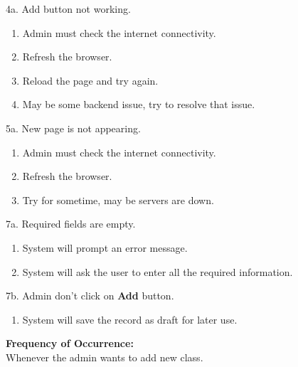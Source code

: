 \documentclass[12pt]{article}
\begin{document}
4a. Add button not working.
\begin{enumerate}
\item Admin must check the internet connectivity.
\item Refresh the browser.
\item Reload the page and try again.
\item May be some backend issue, try to resolve that issue.
\end{enumerate}
5a. New page is not appearing.
\begin{enumerate}
\item Admin must check the internet connectivity.
\item Refresh the browser.
\item Try for sometime, may be servers are down.
\end{enumerate}
7a. Required fields are empty.
\begin{enumerate}
\item System will prompt an error message.
\item System will ask the user to enter all the required information.
\end{enumerate}
7b. Admin don't click on \textbf{Add} button.
\begin{enumerate}
\item System will save the record as draft for later use.
\end{enumerate}
\textbf{Frequency of Occurrence:}\\
Whenever the admin wants to add new class.
\end{document}
